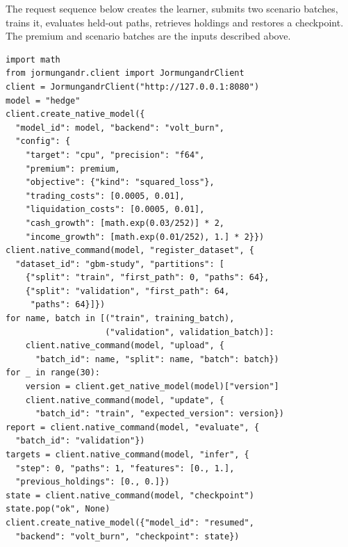 \documentclass[8pt]{strategynet-journal}
\begin{document}
\begin{minipage}{\textwidth}
\noindent The request sequence below creates the learner, submits two scenario batches,
trains it, evaluates held-out paths, retrieves holdings and restores a checkpoint.
The premium and scenario batches are the inputs described above.
\par\medskip
\begin{lstlisting}[basicstyle=\ttfamily\normalsize,columns=fullflexible,breaklines=true,frame=single,framesep=3pt]
import math
from jormungandr.client import JormungandrClient
client = JormungandrClient("http://127.0.0.1:8080")
model = "hedge"
client.create_native_model({
  "model_id": model, "backend": "volt_burn",
  "config": {
    "target": "cpu", "precision": "f64",
    "premium": premium,
    "objective": {"kind": "squared_loss"},
    "trading_costs": [0.0005, 0.01],
    "liquidation_costs": [0.0005, 0.01],
    "cash_growth": [math.exp(0.03/252)] * 2,
    "income_growth": [math.exp(0.01/252), 1.] * 2}})
client.native_command(model, "register_dataset", {
  "dataset_id": "gbm-study", "partitions": [
    {"split": "train", "first_path": 0, "paths": 64},
    {"split": "validation", "first_path": 64,
     "paths": 64}]})
for name, batch in [("train", training_batch),
                    ("validation", validation_batch)]:
    client.native_command(model, "upload", {
      "batch_id": name, "split": name, "batch": batch})
for _ in range(30):
    version = client.get_native_model(model)["version"]
    client.native_command(model, "update", {
      "batch_id": "train", "expected_version": version})
report = client.native_command(model, "evaluate", {
  "batch_id": "validation"})
targets = client.native_command(model, "infer", {
  "step": 0, "paths": 1, "features": [0., 1.],
  "previous_holdings": [0., 0.]})
state = client.native_command(model, "checkpoint")
state.pop("ok", None)
client.create_native_model({"model_id": "resumed",
  "backend": "volt_burn", "checkpoint": state})
\end{lstlisting}
\end{minipage}
\clearpage
\end{document}
